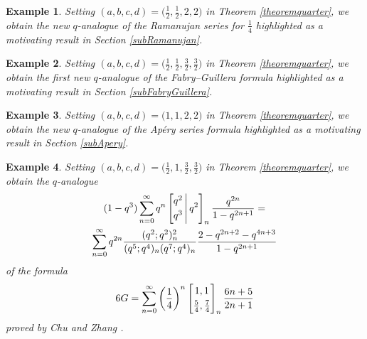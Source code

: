 \documentclass[12pt]{article}
\newtheorem{example}{Example}
\begin{document}
\begin{example}
 Setting $(a, b, c, d) = \big( \frac{1}{2}, \frac{1}{2}, 2, 2 \big)$ in Theorem \ref{theoremquarter}, 
 we obtain the new $q$-analogue of the Ramanujan series for $\frac{1}{4}$ 
 highlighted as a motivating result in Section \ref{subRamanujan}. 
\end{example}

\begin{example}
 Setting $(a, b, c, d) = \big( \frac{1}{2}, \frac{1}{2}, \frac{3}{2}, \frac{3}{2} \big)$ 
 in Theorem \ref{theoremquarter}, we obtain 
 the first new $q$-analogue of the Fabry--Guillera formula highlighted 
 as a motivating result in Section \ref{subFabryGuillera}. 
\end{example}

\begin{example}
 Setting $(a, b, c, d) = \big( 1, 1, 2, 2 \big)$ 
 in Theorem \ref{theoremquarter}, we obtain 
 the new $q$-analogue of the Ap\'{e}ry series 
 formula highlighted as a motivating result in Section \ref{subApery}. 
\end{example}
 
\begin{example}
 Setting $(a, b, c, d) = 
 \big( \frac{1}{2}, 1, \frac{3}{2}, \frac{3}{2} \big)$ in Theorem \ref{theoremquarter}, we obtain the $q$-analogue 
\begin{multline*}
 (1-q^3) \sum_{n=0}^{\infty} q^{n} 
 \left[ \begin{matrix} 
 q^2 \vspace{1mm} \\ 
 q^3 \end{matrix} \, \Bigg| \, q^2 \right]_{n} \frac{q^{2n}}{1-q^{2n+1}} = \\ 
 \sum_{n=0}^{\infty} q^{2n} 
 \frac{(q^2;q^2)_{n}^{2}}{(q^5;q^4)_{n} (q^7;q^4)_{n}} \frac{2 - q^{2n+2} - q^{4n+3}}{1-q^{2n+1}} 
 \end{multline*}
 of the formula 
\begin{equation*}
 6 G = 
 \sum_{n = 0}^{\infty} 
 \left( \frac{1}{4} \right)^{n} \left[ \begin{matrix} 
 1, 1 
 \vspace{1mm} \\ 
 \frac{5}{4}, \frac{7}{4} 
 \end{matrix} \right]_{n} \frac{6n+5}{2n+1} 
 \end{equation*}
 proved by Chu and Zhang \cite[Example 84]{ChuZhang2014}. 
\end{example}
\end{document}
